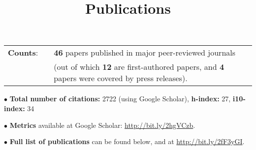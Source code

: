 \documentclass[11pt,letterpaper,sans]{moderncv}
\title{\huge{Publications}}
\begin{document}
\makecvtitle 

\vspace{-2mm}


\cvitem{}
{
\begin{tabular}{rcl}
\textbf{Counts}: &\hspace{0.3cm} &{\textbf{46} papers published in major peer-reviewed journals} \\
& &{(out of which \textbf{12} are first-authored papers, and \textbf{4} papers were covered by press releases).}
\end{tabular}
}

$\bullet$ \textbf{Total number of citations:} 2722 (using Google Scholar), \textbf{h-index:} 27, \textbf{i10-index:} 34

$\bullet$ \textbf{Metrics} available at Google Scholar: {\color{color1} \href{http://bit.ly/2hgVCzb}{http://bit.ly/2hgVCzb}}.

$\bullet$ \textbf{Full list of publications} can be found below, and at {\color{color1} \href{http://bit.ly/2fF3yGI}{http://bit.ly/2fF3yGI}}.

\vspace{0.4cm}
%

\end{document}

